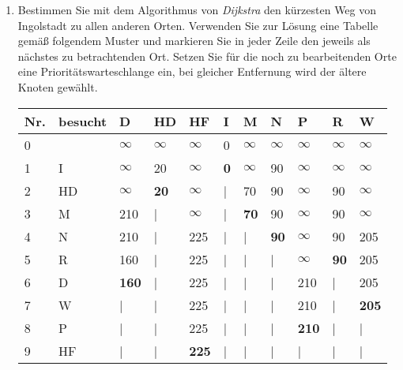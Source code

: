 \documentclass{bschlangaul-aufgabe}
\begin{document}
\begin{enumerate}


\item Bestimmen Sie mit dem Algorithmus von \emph{Dijkstra} den
kürzesten Weg von Ingolstadt zu allen anderen Orten. Verwenden Sie zur
Lösung eine Tabelle gemäß folgendem Muster und markieren Sie in jeder
Zeile den jeweils als nächstes zu betrachtenden Ort. Setzen Sie für die
noch zu bearbeitenden Orte eine Prioritätswarteschlange ein, \dh bei
gleicher Entfernung wird der ältere Knoten gewählt.

\begin{bAntwort}
\begin{tabular}{lllllllllll}
\bf{Nr.}     & \bf{besucht} & \bf{D}       & \bf{HD}      & \bf{HF}      & \bf{I}       & \bf{M}       & \bf{N}       & \bf{P}       & \bf{R}       & \bf{W}       \\
\hline
0            &              & $\infty$     & $\infty$     & $\infty$     & 0            & $\infty$     & $\infty$     & $\infty$     & $\infty$     & $\infty$     \\
1            & I            & $\infty$     & 20           & $\infty$     & \bf{0}       & $\infty$     & 90           & $\infty$     & $\infty$     & $\infty$     \\
2            & HD           & $\infty$     & \bf{20}      & $\infty$     & |            & 70           & 90           & $\infty$     & 90           & $\infty$     \\
3            & M            & 210          & |            & $\infty$     & |            & \bf{70}      & 90           & $\infty$     & 90           & $\infty$     \\
4            & N            & 210          & |            & 225          & |            & |            & \bf{90}      & $\infty$     & 90           & 205          \\
5            & R            & 160          & |            & 225          & |            & |            & |            & $\infty$     & \bf{90}      & 205          \\
6            & D            & \bf{160}     & |            & 225          & |            & |            & |            & 210          & |            & 205          \\
7            & W            & |            & |            & 225          & |            & |            & |            & 210          & |            & \bf{205}     \\
8            & P            & |            & |            & 225          & |            & |            & |            & \bf{210}     & |            & |            \\
9            & HF           & |            & |            & \bf{225}     & |            & |            & |            & |            & |            & |            \\
\end{tabular}
\end{bAntwort}


\end{enumerate}
\end{document}
